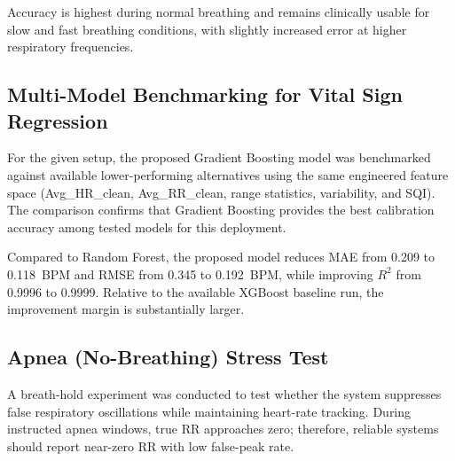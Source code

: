 \documentclass[conference]{IEEEtran}
\begin{document}
Accuracy is highest during normal breathing and remains clinically usable for slow and fast breathing conditions, with slightly increased error at higher respiratory frequencies.

\subsection{Multi-Model Benchmarking for Vital Sign Regression}

For the given setup, the proposed Gradient Boosting model was benchmarked against available lower-performing alternatives using the same engineered feature space (Avg\_HR\_clean, Avg\_RR\_clean, range statistics, variability, and SQI). The comparison confirms that Gradient Boosting provides the best calibration accuracy among tested models for this deployment.

\begin{table}[t]
\centering
\caption{Verified Model Comparison for HR Calibration in the Given Setup}
\label{tab:model_benchmark_extended}
\renewcommand{\arraystretch}{1.2}
\end{table}

Compared to Random Forest, the proposed model reduces MAE from 0.209 to 0.118~BPM and RMSE from 0.345 to 0.192~BPM, while improving $R^2$ from 0.9996 to 0.9999. Relative to the available XGBoost baseline run, the improvement margin is substantially larger.

\subsection{Apnea (No-Breathing) Stress Test}

A breath-hold experiment was conducted to test whether the system suppresses false respiratory oscillations while maintaining heart-rate tracking. During instructed apnea windows, true RR approaches zero; therefore, reliable systems should report near-zero RR with low false-peak rate.
\end{document}
